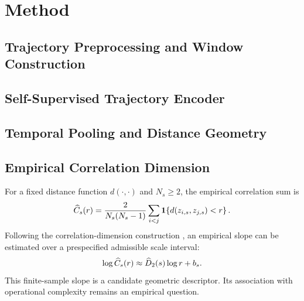 \section{Method}
\label{sec:method}

\subsection{Trajectory Preprocessing and Window Construction}

\subsection{Self-Supervised Trajectory Encoder}

\subsection{Temporal Pooling and Distance Geometry}

\subsection{Empirical Correlation Dimension}
For a fixed distance function $d(\cdot,\cdot)$ and $N_s\geq2$, the
empirical correlation sum is
\begin{equation}
\widehat{C}_s(r)=
\frac{2}{N_s(N_s-1)}
\sum_{i<j}\mathbf{1}\!\left\{d(z_{i,s},z_{j,s})<r\right\}.
\label{eq:correlation-sum}
\end{equation}
Following the correlation-dimension construction
\cite{grassberger1983measuring}, an empirical slope can be estimated over
a prespecified admissible scale interval:
\begin{equation}
\log\widehat{C}_s(r)\approx \widehat{D}_{2}(s)\log r+b_s.
\label{eq:empirical-slope}
\end{equation}
This finite-sample slope is a candidate geometric descriptor. Its
association with operational complexity remains an empirical question.
